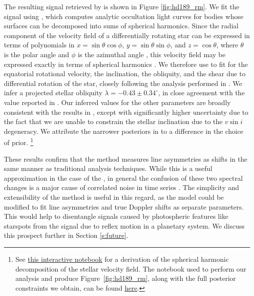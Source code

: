 \documentclass[twocolumn]{aastex62}
\begin{document}
The resulting \RV signal retrieved by \wobble is shown in Figure \ref{fig:hd189_rm}. 
We fit the signal using \starry \citep{Luger2018}, which computes analytic occultation
light curves for bodies whose surfaces can be decomposed into sums
of spherical harmonics. Since the radial component of the velocity field of a 
differentially rotating star can be expressed in terms of polynomials in 
$x = \sin\theta\cos\phi$, $y = \sin\theta\sin\phi$, and $z=\cos\theta$, where
$\theta$ is the polar angle and $\phi$ is the azimuthal angle \citep[c.f. Equation 91 in][]{Short2018},
this velocity field may be expressed exactly in terms of spherical harmonics
\citep{LugerBedell2019}.
We therefore use \starry to fit for the equatorial rotational velocity, the inclination,
the obliquity, and the shear due to differential rotation of the star, closely
following the analysis performed in \citet{Cegla2016}.
We infer a projected stellar obliquity $\lambda = -0.43 \pm 0.34^\circ$, in close agreement
with the value reported in \citet{Cegla2016}. Our inferred values for the other parameters
are broadly consistent with the results in \citet{Cegla2016}, except with significantly
higher uncertainty due to the fact that we are unable to constrain the stellar inclination
due to the $v\sin i$ degeneracy. We attribute the narrower posteriors in \citet{Cegla2016}
to a difference in the choice of prior.
\footnote{See \href{https://github.com/megbedell/wobble/tree/master/paper/figures/HD189733/DifferentialRotationWithSphericalHarmonics.ipynb}{this interactive notebook} 
          for a derivation of the spherical harmonic decomposition of the stellar velocity field. 
          The notebook used to perform our analysis and produce Figure~\ref{fig:hd189_rm}, along with the full posterior constraints we obtain, can be found 
          \href{https://github.com/megbedell/wobble/tree/master/paper/figures/HD189733/HD189733bWithStarry.ipynb}{here}.}

These results confirm that the \wobble method measures line asymmetries as \RV shifts in the same manner as traditional \RV analysis techniques. 
While this is a useful approximation in the case of the \RM, in general the confusion of these two spectral changes is a major cause of correlated noise in \RV time series \citep[e.g.][]{Queloz2001}. 
The simplicity and extensibility of the \wobble method is useful in this regard, as the model could be modified to fit line asymmetries and true Doppler shifts as separate parameters. 
This would help to disentangle signals caused by photospheric features like starspots from the \RV signal due to reflex motion in a planetary system. 
We discuss this prospect further in Section \ref{s:future}.
\end{document}
